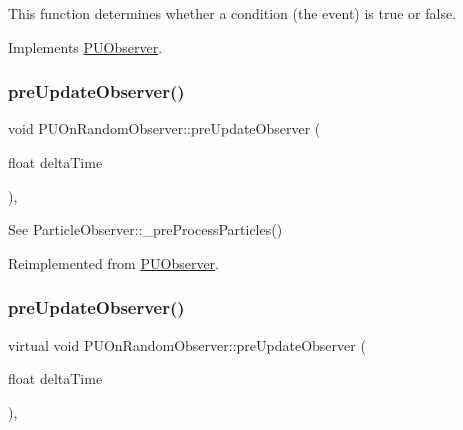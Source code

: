 This function determines whether a condition (the event) is true or false. 

Implements \hyperlink{classPUObserver_a50f59cc3245e291b641463db5d3037f7}{P\+U\+Observer}.

\mbox{\label{classPUOnRandomObserver_af4d89ddfdab42970bd7595b1395bef8e}} 
\subsubsection{\texorpdfstring{pre\+Update\+Observer()}{preUpdateObserver()}\hspace{0.1cm}{\footnotesize\ttfamily [1/2]}}
{\footnotesize\ttfamily void P\+U\+On\+Random\+Observer\+::pre\+Update\+Observer (\begin{DoxyParamCaption}\item[{float}]{delta\+Time }\end{DoxyParamCaption})\hspace{0.3cm}{\ttfamily [override]}, {\ttfamily [virtual]}}

See Particle\+Observer\+::\+\_\+pre\+Process\+Particles() 

Reimplemented from \hyperlink{classPUObserver}{P\+U\+Observer}.

\mbox{\label{classPUOnRandomObserver_a4396d7126702dcd8a4e789131e9c3efe}} 
\subsubsection{\texorpdfstring{pre\+Update\+Observer()}{preUpdateObserver()}\hspace{0.1cm}{\footnotesize\ttfamily [2/2]}}
{\footnotesize\ttfamily virtual void P\+U\+On\+Random\+Observer\+::pre\+Update\+Observer (\begin{DoxyParamCaption}\item[{float}]{delta\+Time }\end{DoxyParamCaption})\hspace{0.3cm}{\ttfamily [override]}, {\ttfamily [virtual]}}

